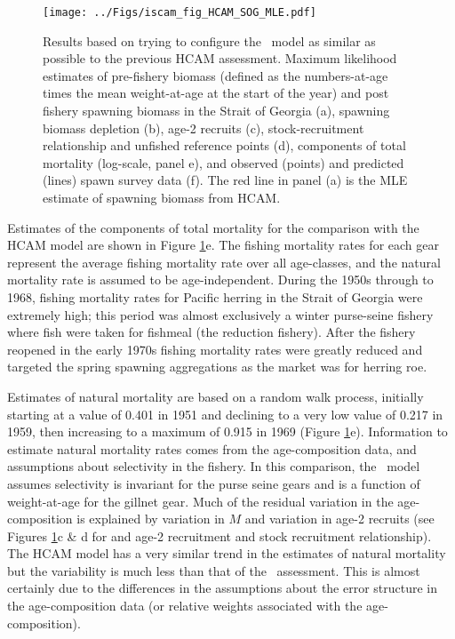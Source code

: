 \begin{figure}[!tbp]
	\texttt{[image: ../Figs/iscam\_fig\_HCAM\_SOG\_MLE.pdf]}\\
	\caption{Results  based on trying to configure the \iscam\ model as similar as possible to the previous HCAM assessment.  Maximum likelihood estimates of pre-fishery biomass (defined as the numbers-at-age times the mean weight-at-age at the start of the year) and post fishery spawning biomass in the Strait of Georgia (a), spawning biomass depletion (b), age-2 recruits (c), stock-recruitment relationship and unfished reference points (d), components of total mortality (log-scale, panel e), and observed (points) and predicted (lines) spawn survey data (f).  The red line in panel (a) is the MLE estimate of spawning biomass from HCAM.}\label{fig1_HCAM_ctrl}
\end{figure}


Estimates of the components of total mortality for the comparison with the HCAM model are shown in Figure \ref{fig1_HCAM_ctrl}e.  The fishing mortality rates for each gear represent the average fishing mortality rate over all age-classes, and the natural mortality rate is assumed to be age-independent.  During the 1950s through to 1968, fishing mortality rates for Pacific herring in the Strait of Georgia were extremely high; this period was almost exclusively a winter purse-seine fishery where fish were taken for fishmeal (the reduction fishery).  After the fishery reopened in the early 1970s fishing mortality rates were greatly reduced and targeted the spring spawning aggregations as the market was for herring roe. 

Estimates of natural mortality are based on a random walk process, initially starting at a value of 0.401 in 1951 and declining to a very low value of 0.217 in 1959, then increasing to a maximum of 0.915 in 1969 (Figure \ref{fig1_HCAM_ctrl}e).  Information to estimate natural mortality rates comes from the age-composition data, and assumptions about selectivity in the fishery.  In this comparison, the \iscam\ model assumes selectivity is invariant for the purse seine gears and is a function of weight-at-age for the gillnet gear. Much of the residual variation in the age-composition is explained by variation in $M$ and variation in age-2 recruits (see Figures \ref{fig1_HCAM_ctrl}c \& d for and age-2 recruitment and stock recruitment relationship).  The HCAM model has a very similar trend in the estimates of natural mortality but the variability is much less than that of the \iscam\ assessment.  This is almost certainly due to the differences in the assumptions about the error structure in the age-composition data (or relative weights associated with the age-composition).




